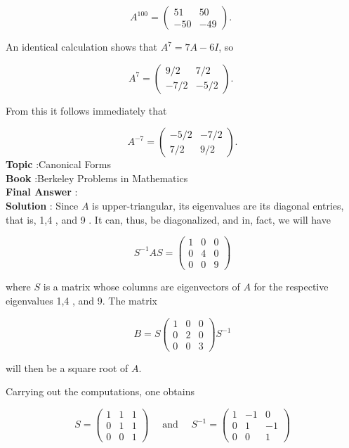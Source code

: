 \documentclass[10pt]{article}
\begin{document}
$$
A^{100}=\left(\begin{array}{cc}
51 & 50 \\
-50 & -49
\end{array}\right) \text {. }
$$

An identical calculation shows that $A^{7}=7 A-6 I$, so

$$
A^{7}=\left(\begin{array}{cc}
9 / 2 & 7 / 2 \\
-7 / 2 & -5 / 2
\end{array}\right) \text {. }
$$

From this it follows immediately that

$$
A^{-7}=\left(\begin{array}{rr}
-5 / 2 & -7 / 2 \\
7 / 2 & 9 / 2
\end{array}\right) .
$$
\textbf{Topic} :Canonical Forms \\
\textbf{Book} :Berkeley Problems in Mathematics\\
\textbf{Final Answer} :\\


\textbf{Solution} : Since $A$ is upper-triangular, its eigenvalues are its diagonal entries, that is, 1,4 , and 9 . It can, thus, be diagonalized, and in, fact, we will have

$$
S^{-1} A S=\left(\begin{array}{ccc}
1 & 0 & 0 \\
0 & 4 & 0 \\
0 & 0 & 9
\end{array}\right)
$$

where $S$ is a matrix whose columns are eigenvectors of $A$ for the respective eigenvalues 1,4 , and 9. The matrix

$$
B=S\left(\begin{array}{lll}
1 & 0 & 0 \\
0 & 2 & 0 \\
0 & 0 & 3
\end{array}\right) S^{-1}
$$

will then be a square root of $A$.

Carrying out the computations, one obtains

$$
S=\left(\begin{array}{lll}
1 & 1 & 1 \\
0 & 1 & 1 \\
0 & 0 & 1
\end{array}\right) \quad \text { and } \quad S^{-1}=\left(\begin{array}{ccc}
1 & -1 & 0 \\
0 & 1 & -1 \\
0 & 0 & 1
\end{array}\right)
$$
\end{document}

